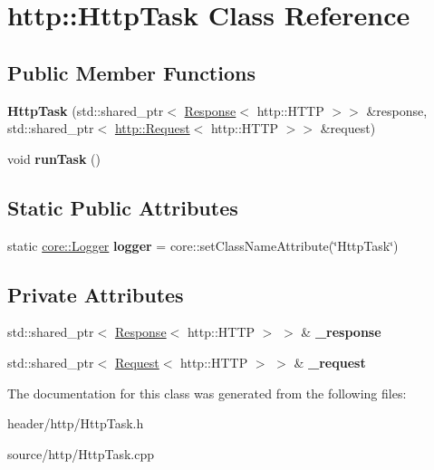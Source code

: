 \hypertarget{classhttp_1_1_http_task}{}\section{http\+:\+:Http\+Task Class Reference}
\label{classhttp_1_1_http_task}
\subsection*{Public Member Functions}
\begin{DoxyCompactItemize}
\item 
\mbox{\label{classhttp_1_1_http_task_a19e0362421e3c9332460d99b0ab7f13e}} 
{\bfseries Http\+Task} (std\+::shared\+\_\+ptr$<$ \hyperlink{classhttp_1_1_response}{Response}$<$ http\+::\+H\+T\+TP $>$$>$ \&response, std\+::shared\+\_\+ptr$<$ \hyperlink{classhttp_1_1_request}{http\+::\+Request}$<$ http\+::\+H\+T\+TP $>$$>$ \&request)
\item 
\mbox{\label{classhttp_1_1_http_task_a2b62fcf83f5ea39cf514019433fba8ae}} 
void {\bfseries run\+Task} ()
\end{DoxyCompactItemize}
\subsection*{Static Public Attributes}
\begin{DoxyCompactItemize}
\item 
\mbox{\label{classhttp_1_1_http_task_a7aba260b3b0a6d5618562e04c6641179}} 
static \hyperlink{classcore_1_1_logger}{core\+::\+Logger} {\bfseries logger} = core\+::set\+Class\+Name\+Attribute(\char`\"{}Http\+Task\char`\"{})
\end{DoxyCompactItemize}
\subsection*{Private Attributes}
\begin{DoxyCompactItemize}
\item 
\mbox{\label{classhttp_1_1_http_task_af69a2447db2559b701847ab74fbac643}} 
std\+::shared\+\_\+ptr$<$ \hyperlink{classhttp_1_1_response}{Response}$<$ http\+::\+H\+T\+TP $>$ $>$ \& {\bfseries \+\_\+response}
\item 
\mbox{\label{classhttp_1_1_http_task_a1065dfd47fc586f4f73c1d2c9ca8abc6}} 
std\+::shared\+\_\+ptr$<$ \hyperlink{classhttp_1_1_request}{Request}$<$ http\+::\+H\+T\+TP $>$ $>$ \& {\bfseries \+\_\+request}
\end{DoxyCompactItemize}


The documentation for this class was generated from the following files\+:\begin{DoxyCompactItemize}
\item 
header/http/Http\+Task.\+h\item 
source/http/Http\+Task.\+cpp\end{DoxyCompactItemize}
